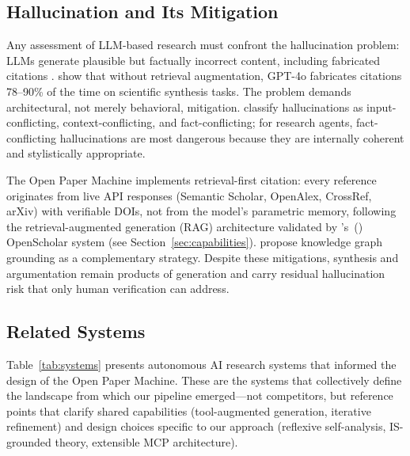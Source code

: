 \documentclass{article}
\begin{document}
\subsection{Hallucination and Its Mitigation}

Any assessment of LLM-based research must confront the hallucination problem: LLMs generate plausible but factually incorrect content, including fabricated citations \citep{alkaissi2023hallucinations,zhang2025hallucination}. \citet{asai2024openscholar} show that without retrieval augmentation, GPT-4o fabricates citations 78--90\% of the time on scientific synthesis tasks. The problem demands architectural, not merely behavioral, mitigation. \citet{zhang2025hallucination} classify hallucinations as input-conflicting, context-conflicting, and fact-conflicting; for research agents, fact-conflicting hallucinations are most dangerous because they are internally coherent and stylistically appropriate.

The Open Paper Machine implements retrieval-first citation: every reference originates from live API responses (Semantic Scholar, OpenAlex, CrossRef, arXiv) with verifiable DOIs, not from the model's parametric memory, following the retrieval-augmented generation (RAG) architecture validated by \citeauthor{asai2024openscholar}'s~(\citeyear{asai2024openscholar}) OpenScholar system (see Section~\ref{sec:capabilities}). \citet{guan2024knowledge} propose knowledge graph grounding as a complementary strategy. Despite these mitigations, synthesis and argumentation remain products of generation and carry residual hallucination risk that only human verification can address.

\subsection{Related Systems}

Table~\ref{tab:systems} presents autonomous AI research systems that informed the design of the Open Paper Machine. These are the systems that collectively define the landscape from which our pipeline emerged---not competitors, but reference points that clarify shared capabilities (tool-augmented generation, iterative refinement) and design choices specific to our approach (reflexive self-analysis, IS-grounded theory, extensible MCP architecture).
\end{document}
